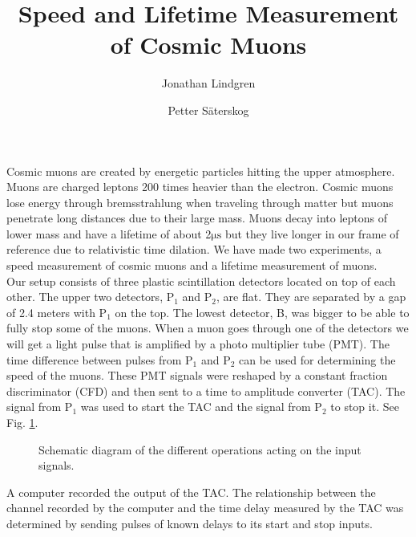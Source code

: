 \documentclass[10pt,twocolumn]{article}
\title{Speed and Lifetime Measurement of Cosmic Muons}
\author{Jonathan Lindgren \and Petter Säterskog}
\begin{document}
Cosmic muons are created by energetic particles hitting the upper atmosphere. Muons are charged leptons 200 times heavier than the electron. Cosmic muons lose energy through bremsstrahlung when traveling through matter but muons penetrate long distances due to their large mass\cite{PhysRevD.45.3051}. Muons decay into leptons of lower mass and have a lifetime of about 2$\mathrm{\mu s}$ but they live longer in our frame of reference due to relativistic time dilation\cite{frisch:342}. We have made two experiments, a speed measurement of cosmic muons and a lifetime measurement of muons.\\

Our setup consists of three plastic scintillation detectors located on top of each other. The upper two detectors, P$_1$ and P$_2$, are flat. They are separated by a gap of 2.4 meters with P$_1$ on the top. The lowest detector, B, was bigger to be able to fully stop some of the muons. When a muon goes through one of the detectors we will get a light pulse that is amplified by a photo multiplier tube (PMT). The time difference between pulses from P$_1$ and P$_2$ can be used for determining the speed of the muons. These PMT signals were reshaped by a constant fraction discriminator (CFD) and then sent to a time to amplitude converter (TAC). The signal from P$_1$ was used to start the TAC and the signal from P$_2$ to stop it. See Fig. \ref{setup}.
\begin{figure}[h]

\caption{\label{setup} Schematic diagram of the different operations acting on the input signals.}
\end{figure}
A computer recorded the output of the TAC. The relationship between the channel recorded by the computer and the time delay measured by the TAC was determined by sending pulses of known delays to its start and stop inputs.\\  %
\end{document}

